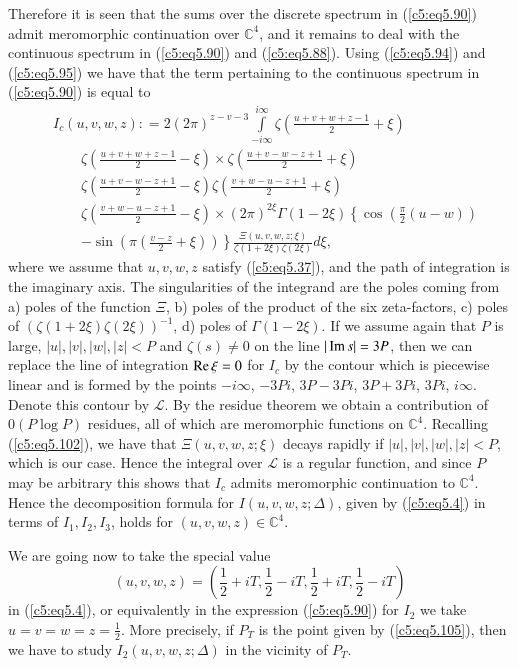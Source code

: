 Therefore it is seen that the sums over the discrete spectrum in
(\ref{c5:eq5.90}) admit meromorphic continuation over $\mathbb{C}^4$,
and it remains to deal with the continuous spectrum in
(\ref{c5:eq5.90}) and (\ref{c5:eq5.88}). Using (\ref{c5:eq5.94}) and
(\ref{c5:eq5.95}) we have that the term pertaining to the continuous
spectrum in (\ref{c5:eq5.90}) is equal to  
\begin{align*}
&I_c (u,v,w,z) : = 2(2\pi)^{z-v-3} \int\limits^{i\infty}_{-i\infty}
  \zeta \left(\frac{u+v+w+z-1}{2} + \xi\right)\\ 
& \qquad  \zeta \left(\frac{u+v+w+z-1}{2} - \xi \right) \times 
 \zeta \left(\frac{u+v-w-z+1}{2} + \xi \right) \\
& \qquad \zeta \left(\frac{u+v-w-z+1}{2} - \xi \right)
 \zeta \left( \frac{v+w-u-z+1}{2} + \xi\right) \\
& \qquad  \zeta \left( \frac{v+w-u-z+1}{2} - \xi \right) \times 
 (2\pi)^{2\xi} \Gamma (1-2\xi) \left\{ \cos \left(\frac{\pi}{2} (u-w)
 \right)  \right.\\ 
& \qquad \left. - \sin \left(\pi \left(\frac{v-z}{2} + \xi \right)
 \right)\right\} \frac{\Xi (u,v,w,z;\xi)}{\zeta(1+2\xi) \zeta(2\xi)}
 d\xi,  
\end{align*}
where we assume that $u,v,w,z$ satisfy (\ref{c5:eq5.37}), and the path
of integration is the imaginary axis. The singularities of the
integrand are the poles coming from a) poles of the function $\Xi$, b)
poles of the product of the six zeta-factors, c) poles of $(\zeta
(1+2\xi) \zeta (2\xi))^{-1}$, d) poles of $\Gamma (1-2\xi)$. If we
assume again that $P$ is large, $|u|, |v|, |w|, |z| < P$\pageoriginale
and $\zeta (s) \neq 0$ on the line $|\operatorname{Im} s| = 3P$, then we can replace
the line of integration $\operatorname{Re} \xi = 0$ for $I_c$ by the contour which
is piecewise linear and is formed by the points $-i\infty$, $-3Pi$,
$3P-3Pi$, $3P+3Pi$, $3Pi$, $i\infty$. Denote this contour by
$\mathscr{L}$. By the residue theorem we obtain a contribution of $0(P
\log P)$ residues, all of which are meromorphic functions on
$\mathbb{C}^4$. Recalling (\ref{c5:eq5.102}), we have that
$\Xi(u,v,w,z;\xi)$ decays rapidly if $|u|, |v|, |w|,|z| <P$, which is
our case. Hence the integral over $\mathscr{L}$ is a regular function,
and since $P$ may be arbitrary this shows that $I_c$ admits
meromorphic continuation to $\mathbb{C}^4$. Hence the decomposition
formula for $I(u,v,w,z;\Delta)$, given by (\ref{c5:eq5.4}) in terms of
$I_1, I_2, I_3$, holds for $(u,v,w,z) \in \mathbb{C}^4$. 

We are going now to take the special value
\begin{equation}
(u,v,w,z) = \left(\frac{1}{2} + iT, \frac{1}{2} -iT, \frac{1}{2} + iT,
  \frac{1}{2} -iT \right)\label{c5:eq5.105} 
\end{equation}
in (\ref{c5:eq5.4}), or equivalently in the expression
(\ref{c5:eq5.90}) for $I_2$ we take $u=v = w= z = \frac{1}{2}$. More
precisely, if $P_T$ is the point given by (\ref{c5:eq5.105}), then we
have to study $I_2 (u,v,w,z;\Delta)$ in the vicinity of $P_T$. 

